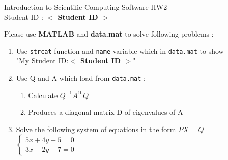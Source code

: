 \documentclass[12pt,a4paper]{article}
\newcommand{\placeholder}[1]{\textbf{$<$ #1 $>$}}
\newcommand{\idnumber}{\placeholder{Student ID}}
\begin{document}
\begin{flushleft}Introduction to Scientific Computing Software HW2
\\Student ID : \idnumber{}\end{flushleft}

Please use \textbf{MATLAB} and \textbf{data.mat} to solve following problems : 
\begin{enumerate}
\item Use \texttt{strcat} function and \texttt{name} variable which in \texttt{data.mat} to show \\"My Student ID:\idnumber{}"
\item Use Q and A which load from \texttt{data.mat} :
\begin{enumerate}
\item  Calculate $Q^{-1}A^{10}Q$
\item  Produces a diagonal matrix D of eigenvalues of A
\end{enumerate}
\item Solve the following system of equations in the form $PX=Q$ \\[1em] $\displaystyle{\left\{\begin{array}{l}5x+4y-5=0\\3x-2y+7=0\end{array}\right.}$
\end{enumerate}
\end{document}
